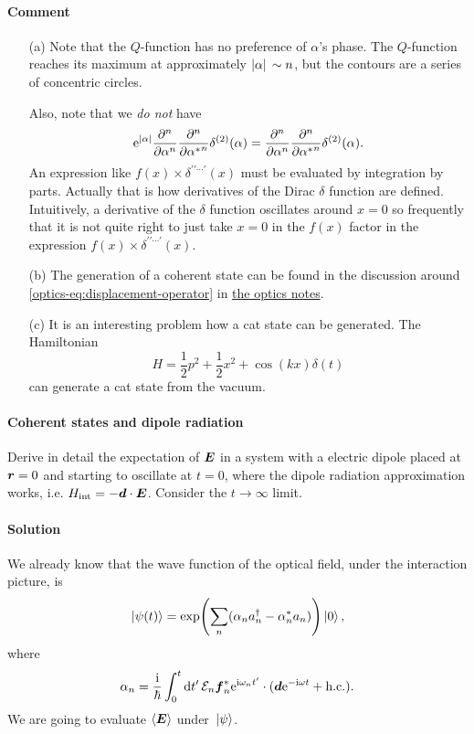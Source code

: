\documentclass[hyperref, a4paper]{article}
\newcommand{\opticsdoc}{\href{../optics/optics}{the optics notes}}
\newcommand*{\ii}{\mathrm{i}}
\newcommand*{\ee}{\mathrm{e}}
\begin{document}
\paragraph{Comment} \begin{itemize}
    \item[(a)] Note that the $Q$-function has no preference of $\alpha$'s phase. The $Q$-function reaches its maximum at approximately $\abs*{\alpha} \sim n$, but the contours are a series of concentric circles.
    
    Also, note that we \emph{do not} have 
    \[
        \ee^{\abs*{\alpha}} \pdv[n]{\alpha} \pdv[n]{{\alpha^*}} \delta^{(2)}(\alpha) = \pdv[n]{\alpha} \pdv[n]{{\alpha^*}} \delta^{(2)}(\alpha) .
    \]
    An expression like $f(x) \times \delta^{\prime \prime \cdots \prime}(x)$ must be evaluated by integration by parts. Actually that is how derivatives of the Dirac $\delta$ function are defined.
    Intuitively, a derivative of the $\delta$ function oscillates around $x=0$ so frequently that it is not quite right to just take $x=0$ in the $f(x)$ factor in the expression $f(x) \times \delta^{\prime \prime \cdots \prime}(x)$.
    \item[(b)] The generation of a coherent state can be found in the discussion around \eqref{optics-eq:displacement-operator} in \opticsdoc.
    \item[(c)] It is an interesting problem how a cat state can be generated. The Hamiltonian
    \begin{equation}
        H = \frac{1}{2} p^2 + \frac{1}{2} x^2 + \cos(kx) \delta(t)
    \end{equation} 
    can generate a cat state from the vacuum.
\end{itemize}

\paragraph{}

\paragraph{Coherent states and dipole radiation} Derive in detail the expectation of $\vb*{E}$ in a system with a electric dipole placed at $\vb*{r}=0$ and starting to oscillate at $t=0$, where the dipole radiation approximation works, i.e. $H_\text{int} = - \vb*{d} \cdot \vb*{E}$. Consider the $t \to \infty$ limit.

\paragraph{Solution} We already know that the wave function of the optical field, under the interaction picture, is 
\begin{equation}
    \ket*{\psi(t)} = \exp(\sum_n (\alpha_n a_n^\dagger - \alpha_n^* a_n) ) \ket*{0},
\end{equation}
where 
\begin{equation}
    \alpha_n = \frac{\ii}{\hbar} \int_0^t \dd{t'} \mathcal{E}_n \vb*{f}_n^* \ee^{\ii \omega_n t'} \cdot (\vb*{d} \ee^{- \ii \omega t} + \text{h.c.}).
\end{equation}
We are going to evaluate $\expval{\vb*{E}}$ under $\ket*{\psi}$.
\end{document}
